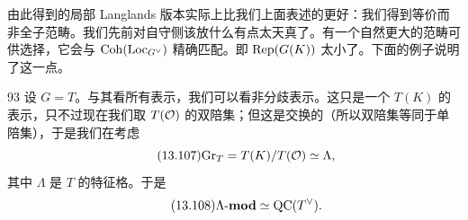 由此得到的局部 Langlands 版本实际上比我们上面表述的更好：我们得到等价而非全子范畴。我们先前对自守侧该放什么有点太天真了。有一个自然更大的范畴可供选择，它会与 $\mathrm{Coh}(\mathrm{Loc}_{G^\vee})$ 精确匹配。即 $\mathrm{Rep}(G(K))$ 太小了。下面的例子说明了这一点。

\begin{srcex}{93}
设 $G=T$。与其看所有表示，我们可以看非分歧表示。这只是一个 $T(K)$ 的表示，只不过现在我们取 $T(\mathcal{O})$ 的双陪集；但这是交换的（所以双陪集等同于单陪集），于是我们在考虑
\begin{equation}\tag{13.107}
\mathrm{Gr}_T=T(K)/T(\mathcal{O})\simeq\Lambda,
\end{equation}
其中 $\Lambda$ 是 $T$ 的特征格。于是
\begin{equation}\tag{13.108}
\Lambda\text{-}\mathbf{mod}\simeq\mathrm{QC}(T^\vee).
\end{equation}
\end{srcex}

